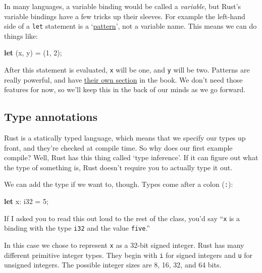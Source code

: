 \documentclass[a4paper,]{book}
\newenvironment{Shaded}{\begin{snugshade}}{\end{snugshade}}
\newcommand{\KeywordTok}[1]{\textcolor[rgb]{0.13,0.29,0.53}{\textbf{{#1}}}}
\newcommand{\DataTypeTok}[1]{\textcolor[rgb]{0.13,0.29,0.53}{{#1}}}
\newcommand{\DecValTok}[1]{\textcolor[rgb]{0.00,0.00,0.81}{{#1}}}
\newcommand{\NormalTok}[1]{{#1}}
\begin{document}
In many languages, a variable binding would be called a \emph{variable},
but Rust's variable bindings have a few tricks up their sleeves. For
example the left-hand side of a \texttt{let} statement is a
`\protect\hyperlink{sec--patterns}{pattern}', not a variable name. This
means we can do things like:

\begin{Shaded}
\begin{Highlighting}[]
\KeywordTok{let} \NormalTok{(x, y) = (}\DecValTok{1}\NormalTok{, }\DecValTok{2}\NormalTok{);}
\end{Highlighting}
\end{Shaded}

After this statement is evaluated, \texttt{x} will be one, and
\texttt{y} will be two. Patterns are really powerful, and have
\protect\hyperlink{sec--patterns}{their own section} in the book. We
don't need those features for now, so we'll keep this in the back of our
minds as we go forward.

\subsection{Type annotations}\label{type-annotations}

Rust is a statically typed language, which means that we specify our
types up front, and they're checked at compile time. So why does our
first example compile? Well, Rust has this thing called `type
inference'. If it can figure out what the type of something is, Rust
doesn't require you to actually type it out.

We can add the type if we want to, though. Types come after a colon
(\texttt{:}):

\begin{Shaded}
\begin{Highlighting}[]
\KeywordTok{let} \NormalTok{x: }\DataTypeTok{i32} \NormalTok{= }\DecValTok{5}\NormalTok{;}
\end{Highlighting}
\end{Shaded}

If I asked you to read this out loud to the rest of the class, you'd say
``\texttt{x} is a binding with the type \texttt{i32} and the value
\texttt{five}.''

In this case we chose to represent \texttt{x} as a 32-bit signed
integer. Rust has many different primitive integer types. They begin
with \texttt{i} for signed integers and \texttt{u} for unsigned
integers. The possible integer sizes are 8, 16, 32, and 64 bits.
\end{document}
